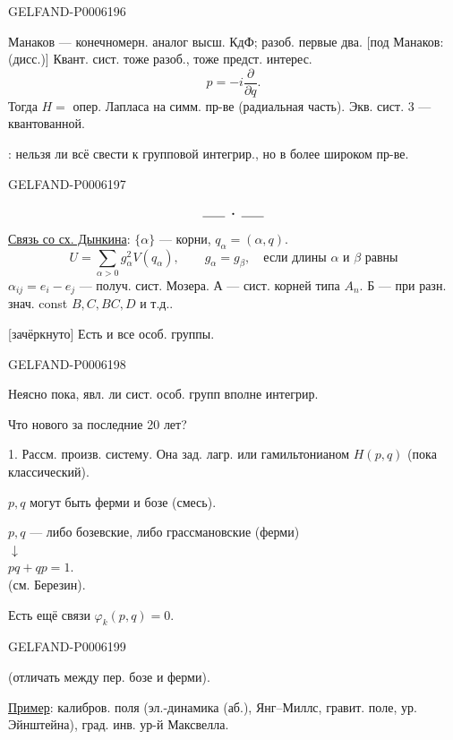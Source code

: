 \begin{GelfandAdjacentEvidence}{GELFAND-P000619}{6}


Манаков — конечномерн. аналог высш. КдФ; разоб. первые два.
[под Манаков: (дисс.)]
Квант. сист. тоже разоб., тоже предст. интерес.
\[
p=-i\frac{\partial}{\partial q}.
\]
Тогда \(H=\) опер. Лапласа на симм. пр-ве (радиальная часть).
Экв. сист. 3 — квантованной.

: нельзя ли всё свести к групповой интегрир., но в более широком пр-ве.
\end{GelfandAdjacentEvidence}
\begin{GelfandAdjacentEvidence}{GELFAND-P000619}{7}

\[\rule{1.8em}{.4pt}\;\boldsymbol{\cdot}\;\rule{1.8em}{.4pt}\]
\underline{Связь со сх. Дынкина}: \(\{\alpha\}\) — корни, \(q_\alpha=(\alpha,q)\).
\[
U=\sum_{\alpha>0}g_\alpha^2V(q_\alpha),\qquad
g_\alpha=g_\beta,\quad\text{если длины \(\alpha\) и \(\beta\) равны}
\]
\(\alpha_{ij}=e_i-e_j\) — получ. сист. Мозера.
А — сист. корней типа \(A_n\).
Б — при разн. знач. const \(B,C,BC,D\) и т.д..

[зачёркнуто] Есть и все особ. группы.
\end{GelfandAdjacentEvidence}
\begin{GelfandAdjacentEvidence}{GELFAND-P000619}{8}

Неясно пока, явл. ли сист. особ. групп вполне интегрир.

\qquad Что нового за последние 20 лет?

1. Рассм. произв. систему. Она зад. лагр. или гамильтонианом \(H(p,q)\) (пока классический).

\(p,q\) могут быть ферми и бозе (смесь).
\begin{flushright}
\(p,q\) — либо бозевские, либо грассмановские (ферми)\\
\(\downarrow\)\\
\(pq+qp=1\).\\
(см. Березин).
\end{flushright}

Есть ещё связи \(\varphi_k(p,q)=0\).
\end{GelfandAdjacentEvidence}
\begin{GelfandAdjacentEvidence}{GELFAND-P000619}{9}

(отличать между пер. бозе и ферми).

\underline{Пример}: калибров. поля (эл.-динамика (аб.), Янг–Миллс,
гравит. поле, ур. Эйнштейна), град. инв. ур-й Максвелла.
\end{GelfandAdjacentEvidence}
